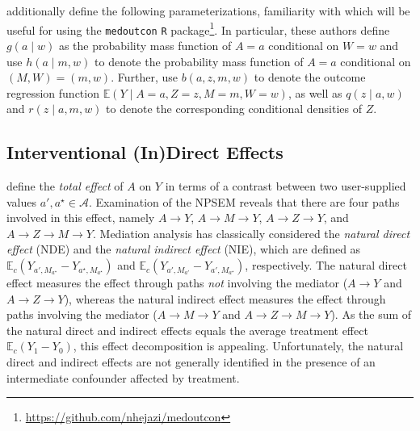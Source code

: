 \documentclass[
  12pt,
]{book}
\newcommand{\passthrough}[1]{#1}
\renewcommand{\href}[2]{#2\footnote{\url{#1}}}
\theoremstyle{definition}
\theoremstyle{definition}
\theoremstyle{definition}
\newcommand{\1}{\mathbbm{1}}
\begin{document}
\citet{diaz2020nonparametric} additionally define the following parameterizations,
familiarity with which will be useful for using the \href{https://github.com/nhejazi/medoutcon}{\passthrough{\lstinline!medoutcon!} \passthrough{\lstinline!R!}
package}. In particular, these authors
define \(g(a \mid w)\) as the probability mass function of \(A = a\) conditional on
\(W = w\) and use \(h(a \mid m, w)\) to denote the probability mass function of \(A = a\) conditional on \((M, W) = (m, w)\). Further, \citet{diaz2020nonparametric} use
\(b(a, z, m, w)\) to denote the outcome regression function \(\mathbb{E}(Y \mid A = a, Z = z, M = m, W = w)\), as well as \(q(z \mid a,w)\) and \(r(z \mid a, m, w)\)
to denote the corresponding conditional densities of \(Z\).

\hypertarget{interventional-indirect-effects-1}{%
\subsection{Interventional (In)Direct Effects}\label{interventional-indirect-effects-1}}

\citet{diaz2020nonparametric} define the \emph{total effect} of \(A\) on \(Y\) in terms of a
contrast between two user-supplied values \(a', a^{\star} \in \mathcal{A}\).
Examination of the NPSEM reveals that there are four paths involved in this
effect, namely \(A \rightarrow Y\), \(A \rightarrow M \rightarrow Y\), \(A \rightarrow Z \rightarrow Y\), and \(A \rightarrow Z \rightarrow M \rightarrow Y\).
Mediation analysis has classically considered the \emph{natural direct effect} (NDE)
and the \emph{natural indirect effect} (NIE), which are defined as
\(\mathbb{E}_c(Y_{a', M_{a^{\star}}} - Y_{a^{\star}, M_{a^{\star}}})\) and
\(\mathbb{E}_c(Y_{a',M_{a'}} - Y_{a',M_{a^{\star}}})\), respectively. The natural
direct effect measures the effect through paths \emph{not} involving the mediator
(\(A \rightarrow Y\) and \(A \rightarrow Z \rightarrow Y\)), whereas the natural
indirect effect measures the effect through paths involving the mediator
(\(A \rightarrow M \rightarrow Y\) and \(A \rightarrow Z \rightarrow M \rightarrow Y\)). As the sum of the natural direct and indirect effects equals the average
treatment effect \(\mathbb{E}_c(Y_1-Y_0)\), this effect decomposition is
appealing. Unfortunately, the natural direct and indirect effects are
not generally identified in the presence of an intermediate confounder affected
by treatment.
\end{document}
